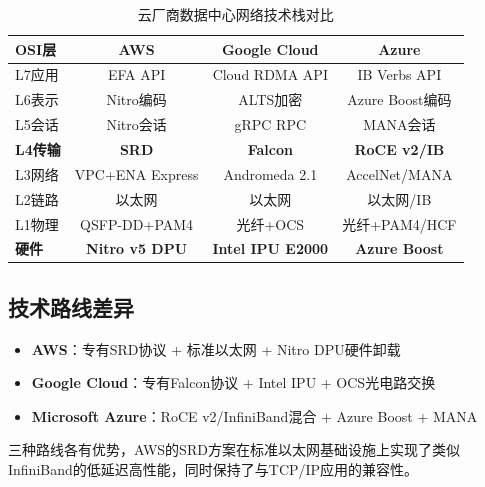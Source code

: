 \begin{table}[htbp]
\centering
\caption{云厂商数据中心网络技术栈对比}
\begin{tabular}{@{}lccc@{}}
\toprule
\textbf{OSI层} & \textbf{AWS} & \textbf{Google Cloud} & \textbf{Azure} \\
\midrule
L7应用 & EFA API & Cloud RDMA API & IB Verbs API \\
L6表示 & Nitro编码 & ALTS加密 & Azure Boost编码 \\
L5会话 & Nitro会话 & gRPC RPC & MANA会话 \\
\textbf{L4传输} & \textbf{SRD} & \textbf{Falcon} & \textbf{RoCE v2/IB} \\
L3网络 & VPC+ENA Express & Andromeda 2.1 & AccelNet/MANA \\
L2链路 & 以太网 & 以太网 & 以太网/IB \\
L1物理 & QSFP-DD+PAM4 & 光纤+OCS & 光纤+PAM4/HCF \\
\textbf{硬件} & \textbf{Nitro v5 DPU} & \textbf{Intel IPU E2000} & \textbf{Azure Boost} \\
\bottomrule
\end{tabular}
\end{table}

\subsection{技术路线差异}

\begin{itemize}
    \item \textbf{AWS}：专有SRD协议 + 标准以太网 + Nitro DPU硬件卸载
    \item \textbf{Google Cloud}：专有Falcon协议 + Intel IPU + OCS光电路交换
    \item \textbf{Microsoft Azure}：RoCE v2/InfiniBand混合 + Azure Boost + MANA
\end{itemize}

三种路线各有优势，AWS的SRD方案在标准以太网基础设施上实现了类似InfiniBand的低延迟高性能，同时保持了与TCP/IP应用的兼容性。
